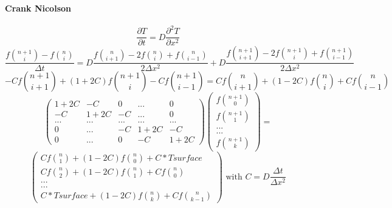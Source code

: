\documentclass[12pt, a4paper]{report}
\begin{document}
\begin{appendix}
\paragraph{Crank Nicolson}
\begin{equation}\frac{\partial T}{\partial t} = D\frac{\partial^2T }{\partial x^2}
\end{equation} 
\begin{equation}\frac{f\binom{n+1}{i} - f\binom{n}{i}}{\Delta t} = D\frac{f\binom{n}{i+1} - 2f\binom{n}{i}+ f\binom{n}{i-1}}{2\Delta x^{2}}+D\frac{f\binom{n+1}{i+1} - 2f\binom{n+1}{i}+ f\binom{n+1}{i-1}}{2\Delta x^{2}}
\end{equation} 
\begin{equation}-Cf\binom{n+1}{i+1}+(1+2C)f\binom{n+1}{i}-Cf\binom{n+1}{i-1} = Cf\binom{n}{i+1}+(1-2C)f\binom{n}{i}+Cf\binom{n}{i-1}
\end{equation}
\begin{equation}
\begin{pmatrix}
1+2C & -C & 0 & ... & 0\\
-C & 1+2C & -C& ... & 0\\
...&...&...&...&...\\
 0 & ...& -C &1+2C & -C \\
0 & ... &  0& -C & 1+2C
\end{pmatrix}
\begin{pmatrix}
f\binom{n+1}{0}\\
f\binom{n+1}{1}\\
...\\
...\\
f\binom{n+1}{k}
\end{pmatrix}
= 
\end{equation}
\begin{equation}
\begin{pmatrix}
Cf\binom{n}{1}+(1-2C)f\binom{n}{0}+C*Tsurface\\
Cf\binom{n}{2}+(1-2C)f\binom{n}{1}+Cf\binom{n}{0}\\
...\\
...\\
C*Tsurface+(1-2C)f\binom{n}{k}+Cf\binom{n}{k-1}
\end{pmatrix}
   \text{ with }
C = D\frac{\Delta t}{\Delta x^{2}}
\end{equation}


\end{appendix}
\end{document}
